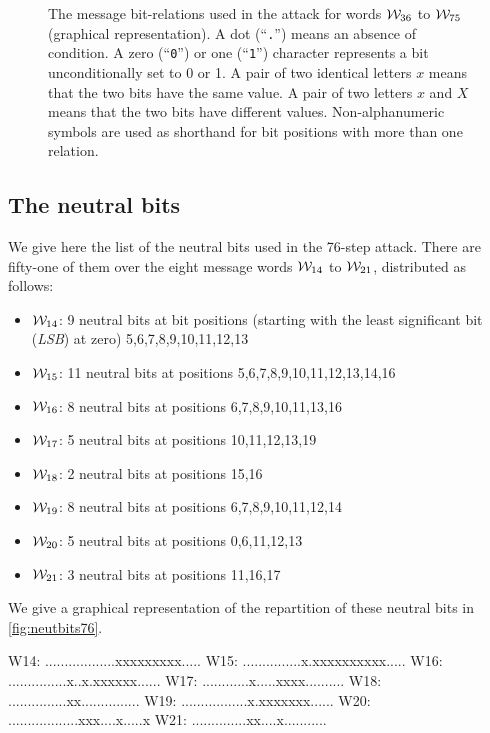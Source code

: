 \begin{figure}[ht]
\centering
  \theverbbox
  \caption{The message bit-relations used in the attack for words $\mathcal{W}_{36}$ to $\mathcal{W}_{75}$ (graphical representation).
  A dot (``\texttt{.}'') means an absence of condition. A zero (``\texttt{0}'') or one (``\texttt{1}'') character represents a bit unconditionally set to 0 or 1.
  A pair of two identical letters $x$ means that the two bits have the same value. A pair of two
  letters $x$ and $X$ means that the two bits have different values.
  Non-alphanumeric symbols are used as shorthand for bit positions with more than one relation.
  \label{fig:msgbitrel76_graph}}
\end{figure}

\subsection{The neutral bits}
\label{sec:neutral_bits}
We give here the list of the neutral bits used in the 76-step attack.
There are fifty-one of them over the eight message words
$\mathcal{W}_{14}$ to $\mathcal{W}_{21}$, distributed as
follows:
\begin{itemize}
\item $\mathcal{W}_{14}$: 9 neutral bits at  bit positions (starting with the least significant bit (\emph{LSB}) at zero) 5,6,7,8,9,10,11,12,13
\item $\mathcal{W}_{15}$: 11 neutral bits at positions 5,6,7,8,9,10,11,12,13,14,16
\item $\mathcal{W}_{16}$: 8 neutral bits at positions 6,7,8,9,10,11,13,16
\item $\mathcal{W}_{17}$: 5 neutral bits at positions 10,11,12,13,19
\item $\mathcal{W}_{18}$: 2 neutral bits at positions 15,16
\item $\mathcal{W}_{19}$: 8 neutral bits at positions 6,7,8,9,10,11,12,14
\item $\mathcal{W}_{20}$: 5 neutral bits at positions 0,6,11,12,13
\item $\mathcal{W}_{21}$: 3 neutral bits at positions 11,16,17
\end{itemize}
We give a graphical representation of the repartition of these neutral bits in \autoref{fig:neutbits76}.

\begin{verbbox}
W14: ..................xxxxxxxxx.....
W15: ...............x.xxxxxxxxxx.....
W16: ...............x..x.xxxxxx......
W17: ............x.....xxxx..........
W18: ...............xx...............
W19: .................x.xxxxxxx......
W20: ..................xxx....x.....x
W21: ..............xx....x...........
\end{verbbox}

